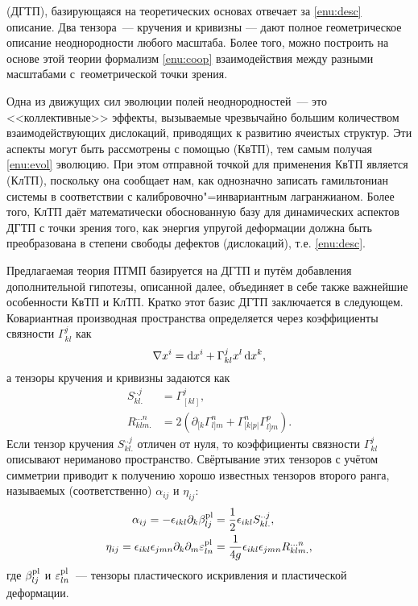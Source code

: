 \documentclass[a4paper, 14pt, titlepage]{extarticle}
\newcommand{\plast}{\textup{pl}} %
\newcommand{\Sklj}{S^{..j}_{kl.}}  %
\newcommand{\Rklmn}{R^{...n}_{klm.}} %
\begin{document}
   (ДГТП), базирующаяся на теоретических основах
   отвечает за \ref{enu:desc} описание. Два тензора~--- кручения и
  кривизны --- дают полное геометрическое описание неоднородности любого масштаба. Более того, можно
  построить на основе этой теории формализм \ref{enu:coop} взаимодействия между разными масштабами
  с~геометрической точки зрения.

  Одна из движущих сил эволюции полей неоднородностей~--- это <<коллективные>> эффекты, вызываемые
  чрезвычайно большим количеством взаимодействующих дислокаций, приводящих к развитию ячеистых
  структур. Эти аспекты могут быть рассмотрены с помощью  (КвТП), тем
  самым получая \ref{enu:evol} эволюцию. При этом отправной точкой для применения КвТП является
   (КлТП), поскольку она сообщает нам, как однозначно записать
  гамильтониан системы в соответствии с калибровочно"=инвариантным лагранжианом. Более того, КлТП
  даёт математически обоснованную базу для динамических аспектов ДГТП с точки зрения того, как
  энергия упругой деформации должна быть преобразована в степени свободы дефектов (дислокаций), т.е. \ref{enu:desc}.

  Предлагаемая теория ПТМП базируется на ДГТП и путём добавления дополнительной гипотезы, описанной
  далее, объединяет в себе также важнейшие особенности КвТП и КлТП. Кратко этот базис ДГТП
  заключается в следующем. Ковариантная производная пространства определяется через коэффициенты
  связности $\Gamma^j_{kl}$ как
  \[
    \nabla x^i = \dif x^i + \Gamma^j_{kl} x^l \dif x ^k,
  \]
  а тензоры кручения и кривизны задаются как
  \begin{align*}
    \Sklj  & = \Gamma^j_{[kl]}, \\
    \Rklmn & = 2\left( \partial_{[k}\Gamma^n_{l]m} + \Gamma^n_{[k|p|}\Gamma^p_{l]m} \right).
  \end{align*}
  Если тензор кручения $\Sklj$ отличен от нуля, то коэффициенты связности $\Gamma^j_{kl}$ описывают
  нериманово пространство. Свёртывание этих тензоров с учётом симметрии приводит к получению хорошо
  известных тензоров второго ранга, называемых (соответственно) 
  $\alpha_{ij}$ и  $\eta_{ij}$:
  \begin{align*}
    \alpha_{ij} = - \epsilon_{ikl} \partial_k \beta^{\plast}_{lj}
              & = \frac{1}{2} \epsilon_{ikl}\Sklj,\\
    \eta_{ij}   = \epsilon_{ikl}\epsilon_{jmn} \partial_k\partial_m \varepsilon^{\plast}_{ln}
              & = \frac{1}{4g}\epsilon_{ikl}\epsilon_{jmn}\Rklmn,
  \end{align*}
  где $\beta^{\plast}_{lj}$ и $\varepsilon^{\plast}_{ln}$~--- тензоры пластического искривления и
  пластической деформации.
\end{document}
